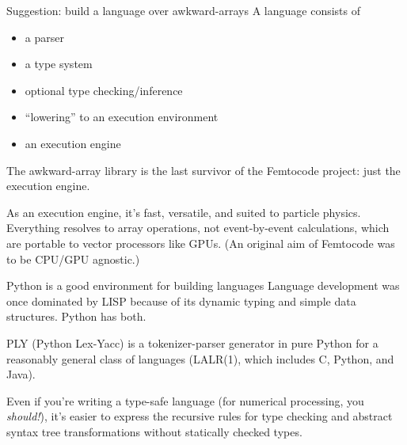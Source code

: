 \documentclass[aspectratio=169]{beamer}
\begin{document}
\begin{frame}{Suggestion: build a language over awkward-arrays}
\large
\vspace{0.5 cm}
A language consists of
\begin{itemize}
\item a parser
\item a type system
\item optional type checking/inference
\item ``lowering'' to an execution environment
\item an execution engine
\end{itemize}

\vspace{0.5 cm}
The awkward-array library is the last survivor of the Femtocode project: just the execution engine.

\vspace{0.5 cm}
As an execution engine, it's fast, versatile, and suited to particle physics. Everything resolves to array operations, not event-by-event calculations, which are portable to vector processors like GPUs. (An original aim of Femtocode was to be CPU/GPU agnostic.)
\end{frame}

\begin{frame}{Python is a good environment for building languages}
\vspace{0.5 cm}
Language development was once dominated by LISP because of its dynamic typing and simple data structures. Python has both.

\vspace{0.5 cm}
PLY (Python Lex-Yacc) is a tokenizer-parser generator in pure Python for a reasonably general class of languages (LALR(1), which includes C, Python, and Java).

\vspace{0.5 cm}
Even if you're writing a type-safe language (for numerical processing, you {\it should!}), it's easier to express the recursive rules for type checking and abstract syntax tree transformations without statically checked types.
\end{frame}
\end{document}
